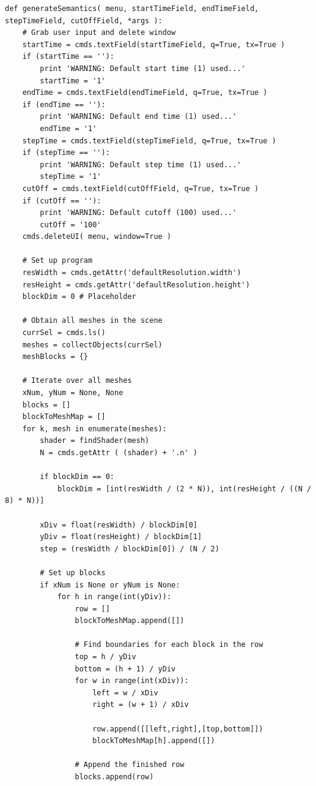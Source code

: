 \documentclass[conference]{IEEEtran}
\begin{document}
{{\begin{verbatim}
def generateSemantics( menu, startTimeField, endTimeField, stepTimeField, cutOffField, *args ):
    # Grab user input and delete window
    startTime = cmds.textField(startTimeField, q=True, tx=True )
    if (startTime == ''):
        print 'WARNING: Default start time (1) used...'
        startTime = '1'
    endTime = cmds.textField(endTimeField, q=True, tx=True )
    if (endTime == ''):
        print 'WARNING: Default end time (1) used...'
        endTime = '1'
    stepTime = cmds.textField(stepTimeField, q=True, tx=True )
    if (stepTime == ''):
        print 'WARNING: Default step time (1) used...'
        stepTime = '1'
    cutOff = cmds.textField(cutOffField, q=True, tx=True )
    if (cutOff == ''):
        print 'WARNING: Default cutoff (100) used...'
        cutOff = '100'
    cmds.deleteUI( menu, window=True )
    
    # Set up program
    resWidth = cmds.getAttr('defaultResolution.width')
    resHeight = cmds.getAttr('defaultResolution.height')
    blockDim = 0 # Placeholder
                
    # Obtain all meshes in the scene
    currSel = cmds.ls()
    meshes = collectObjects(currSel)
    meshBlocks = {}
    
    # Iterate over all meshes
    xNum, yNum = None, None
    blocks = []
    blockToMeshMap = []
    for k, mesh in enumerate(meshes):
        shader = findShader(mesh)
        N = cmds.getAttr ( (shader) + '.n' )
        
        if blockDim == 0:
            blockDim = [int(resWidth / (2 * N)), int(resHeight / ((N / 8) * N))]
        
        xDiv = float(resWidth) / blockDim[0]
        yDiv = float(resHeight) / blockDim[1]
        step = (resWidth / blockDim[0]) / (N / 2)
        
        # Set up blocks
        if xNum is None or yNum is None:
            for h in range(int(yDiv)):
                row = []
                blockToMeshMap.append([])
                
                # Find boundaries for each block in the row
                top = h / yDiv
                bottom = (h + 1) / yDiv
                for w in range(int(xDiv)):
                    left = w / xDiv
                    right = (w + 1) / xDiv
                    
                    row.append([[left,right],[top,bottom]])
                    blockToMeshMap[h].append([])
                    
                # Append the finished row
                blocks.append(row)
            

\end{verbatim}}}
\end{document}
